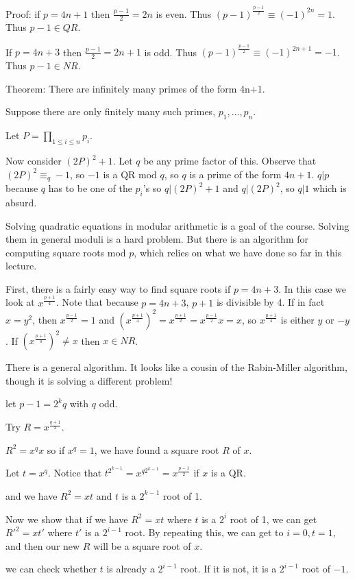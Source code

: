\documentclass[12pt]{article}
\begin{document}
Proof:  if $p=4n+1$ then $\frac{p-1}2 = 2n$ is even.  Thus $(p-1)^\frac{p-1}2 \equiv (-1)^{2n} = 1$.  Thus $p-1 \in QR$.

If $p=4n+3$ then $\frac{p-1}2 = 2n+1$ is odd.  Thus $(p-1)^\frac{p-1}2 \equiv (-1)^{2n+1} = -1$.  Thus $p-1 \in NR$.

Theorem:  There are infinitely many primes of the form 4n+1.

Suppose there are only finitely many such primes, $p_1,\ldots,p_n$.

Let $P= \prod_{1 \leq i \leq n}p_i$.

Now consider $(2P)^2 +1$.  Let $q$ be any prime factor of this.  Observe that $(2P)^2 \equiv_q -1$, so $-1$ is a QR mod $q$, so $q$ is a prime of the form $4n+1$.  $q|p$ because $q$ has to be one of the $p_i$'s so $q|(2P)^2+1$ and $q|(2P)^2$, so $q|1$ which is absurd.

Solving quadratic equations in modular arithmetic is a goal of the course.  Solving them in general moduli is a hard problem.
But there is an algorithm for computing square roots mod $p$, which relies on what we have done so far in this lecture.

First, there is a fairly easy way to find square roots if $p = 4n+3$.  In this case we look at $x^\frac{p+1}4$.  Note that
because $p=4n+3$, $p+1$ is divisible by 4.  If in fact $x=y^2$, then $x^\frac{p-1}2=1$ and $(x^\frac{p+1}4)^2= x^\frac{p+1}2 = x^\frac{p-1}2x =x$, so $x^\frac{p+1}4$ is either $y$ or $-y$.  If $(x^\frac{p+1}4)^2 \neq x$ then $x \in NR$.

There is a general algorithm.  It looks like a cousin of the Rabin-Miller algorithm, though it is solving a different problem!

let $p-1=2^kq$ with $q$ odd.

Try $R=x^\frac{q+1}2$.

$R^2 = x^{q}x$ so if $x^q=1$, we have found a square root $R$ of $x$.


Let $t=x^q$.  Notice that $t^{2^{k-1}}= x^{q2^{k-1}} = x^\frac{p-1}2$ if $x$ is a QR.

and we have $R^2=xt$ and $t$ is a $2^{k-1}$ root of 1.

Now we show that if we have $R^2 = xt$ where $t$ is a $2^i$ root of 1, we can get
$R'^2 = xt'$ where $t'$ is a $2^{i-1}$ root.  By repeating this, we can get to $i=0, t=1$, and then our new $R$ will be a square root of $x$.


we can check whether $t$ is already a $2^{i-1}$ root.  If it is not, it is a $2^{i-1}$ root of $-1$.
\end{document}

